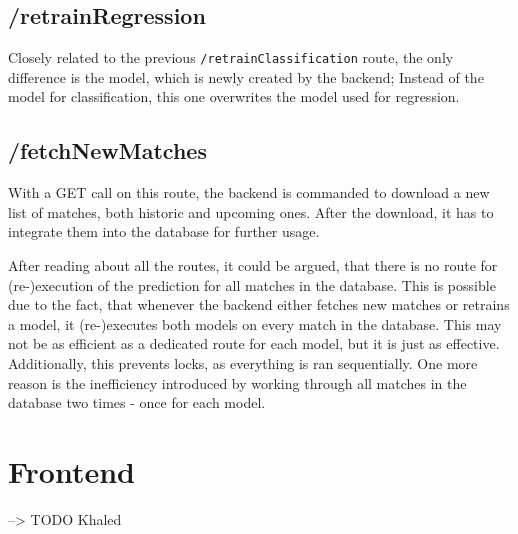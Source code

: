 \subsection{/retrainRegression}
Closely related to the previous \lstinline[columns=fixed]{/retrainClassification} route, the only difference is the model, which is newly created by the backend; Instead of the model for classification, this one overwrites the model used for regression.

\subsection{/fetchNewMatches}
With a GET call on this route, the backend is commanded to download a new list of matches, both historic and upcoming ones. After the download, it has to integrate them into the database for further usage.

After reading about all the routes, it could be argued, that there is no route for (re-)execution of the prediction for all matches in the database. This is possible due to the fact, that whenever the backend either fetches new matches or retrains a model, it (re-)executes both models on every match in the database. This may not be as efficient as a dedicated route for each model, but it is just as effective. Additionally, this prevents locks, as everything is ran sequentially. One more reason is the inefficiency introduced by working through all matches in the database two times - once for each model.

\section{Frontend}
--> TODO Khaled
